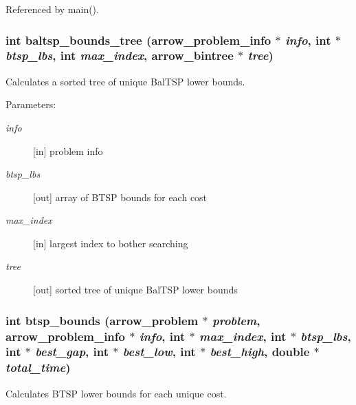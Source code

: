 Referenced by main().\hypertarget{lib_2baltsp_2baltsp-ib_8c_f169c033b4bdc2c08c544daf0e91aa9a}{
\subsubsection[{baltsp\_\-bounds\_\-tree}]{\setlength{\rightskip}{0pt plus 5cm}int baltsp\_\-bounds\_\-tree ({\bf arrow\_\-problem\_\-info} $\ast$ {\em info}, \/  int $\ast$ {\em btsp\_\-lbs}, \/  int {\em max\_\-index}, \/  {\bf arrow\_\-bintree} $\ast$ {\em tree})}}
\label{lib_2baltsp_2baltsp-ib_8c_f169c033b4bdc2c08c544daf0e91aa9a}


Calculates a sorted tree of unique BalTSP lower bounds. 

\begin{Desc}
\item[Parameters:]
\begin{description}
\item[{\em info}]\mbox{[}in\mbox{]} problem info \item[{\em btsp\_\-lbs}]\mbox{[}out\mbox{]} array of BTSP bounds for each cost \item[{\em max\_\-index}]\mbox{[}in\mbox{]} largest index to bother searching \item[{\em tree}]\mbox{[}out\mbox{]} sorted tree of unique BalTSP lower bounds \end{description}
\end{Desc}
\hypertarget{lib_2baltsp_2baltsp-ib_8c_793295ba41f25b193913629e408dd58e}{
\subsubsection[{btsp\_\-bounds}]{\setlength{\rightskip}{0pt plus 5cm}int btsp\_\-bounds ({\bf arrow\_\-problem} $\ast$ {\em problem}, \/  {\bf arrow\_\-problem\_\-info} $\ast$ {\em info}, \/  int $\ast$ {\em max\_\-index}, \/  int $\ast$ {\em btsp\_\-lbs}, \/  int $\ast$ {\em best\_\-gap}, \/  int $\ast$ {\em best\_\-low}, \/  int $\ast$ {\em best\_\-high}, \/  double $\ast$ {\em total\_\-time})}}
\label{lib_2baltsp_2baltsp-ib_8c_793295ba41f25b193913629e408dd58e}


Calculates BTSP lower bounds for each unique cost. 

